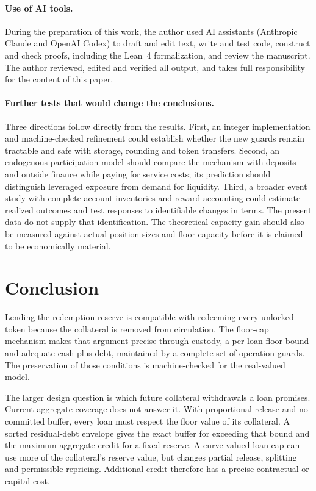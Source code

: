 \paragraph{Use of AI tools.} During the preparation of this work, the author used AI assistants (Anthropic Claude and OpenAI Codex) to draft and edit text, write and test code, construct and check proofs, including the Lean~4 formalization, and review the manuscript. The author reviewed, edited and verified all output, and takes full responsibility for the content of this paper.

\paragraph{Further tests that would change the conclusions.}
Three directions follow directly from the results. First, an integer implementation and machine-checked refinement could establish whether the new guards remain tractable and safe with storage, rounding and token transfers. Second, an endogenous participation model should compare the mechanism with deposits and outside finance while paying for service costs; its prediction should distinguish leveraged exposure from demand for liquidity. Third, a broader event study with complete account inventories and reward accounting could estimate realized outcomes and test responses to identifiable changes in terms. The present data do not supply that identification. The theoretical capacity gain should also be measured against actual position sizes and floor capacity before it is claimed to be economically material.

\section{Conclusion}

Lending the redemption reserve is compatible with redeeming every unlocked token because the collateral is removed from circulation. The floor-cap mechanism makes that argument precise through custody, a per-loan floor bound and adequate cash plus debt, maintained by a complete set of operation guards. The preservation of those conditions is machine-checked for the real-valued model.

The larger design question is which future collateral withdrawals a loan promises. Current aggregate coverage does not answer it. With proportional release and no committed buffer, every loan must respect the floor value of its collateral. A sorted residual-debt envelope gives the exact buffer for exceeding that bound and the maximum aggregate credit for a fixed reserve. A curve-valued loan cap can use more of the collateral's reserve value, but changes partial release, splitting and permissible repricing. Additional credit therefore has a precise contractual or capital cost.

